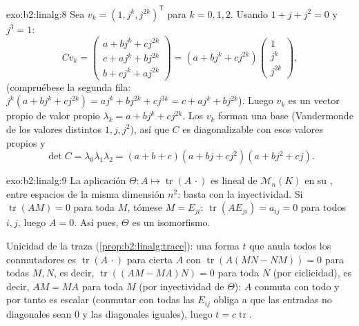 \begin{solution}{exo:b2:linalg:8}
Sea $v_k = (1, j^k, j^{2k})^{\mathsf T}$ para $k = 0, 1, 2$. Usando
$1 + j + j^2 = 0$ y $j^3 = 1$:
\[
C v_k =
\begin{pmatrix}
a + b j^k + c j^{2k}\\
c + a j^k + b j^{2k}\\
b + c j^k + a j^{2k}
\end{pmatrix}
= (a + b j^k + c j^{2k})
\begin{pmatrix} 1\\ j^k\\ j^{2k}\end{pmatrix},
\]
(compruébese la segunda fila: $j^k(a + bj^k + cj^{2k}) = aj^k +
bj^{2k} + cj^{3k} = c + aj^k + bj^{2k}$). Luego $v_k$ es un vector
propio de valor propio $\lambda_k = a + bj^k + cj^{2k}$. Los $v_k$
forman una base (Vandermonde de los valores distintos $1, j, j^2$),
así que $C$ es diagonalizable con esos valores propios y
\[
\det C = \lambda_0\lambda_1\lambda_2
= (a+b+c)(a + bj + cj^2)(a + bj^2 + cj).
\]
\end{solution}

\begin{solution}{exo:b2:linalg:9}
La aplicación $\Theta \colon A \mapsto \operatorname{tr}(A\,\cdot)$
es lineal de $\mathcal{M}_n(K)$ en su , entre espacios de la
misma dimensión $n^2$: basta con la inyectividad. Si
$\operatorname{tr}(AM) = 0$ para toda $M$, tómese $M = E_{ji}$:
$\operatorname{tr}(A E_{ji}) = a_{ij} = 0$ para todos $i, j$, luego
$A = 0$. Así pues, $\Theta$ es un isomorfismo.

Unicidad de la traza (\cref{prop:b2:linalg:trace}): una forma $t$ que
anula todos los conmutadores es $\operatorname{tr}(A\,\cdot)$ para
cierta $A$ con $\operatorname{tr}(A(MN - NM)) = 0$ para todas $M, N$,
es decir, $\operatorname{tr}((AM - MA)N) = 0$ para toda $N$ (por
ciclicidad), es decir, $AM = MA$ para toda $M$ (por inyectividad de
$\Theta$): $A$ conmuta con todo y por tanto es escalar (conmutar con
todas las $E_{ij}$ obliga a que las entradas no diagonales sean $0$ y
las diagonales iguales), luego $t = c \operatorname{tr}$.
\end{solution}

